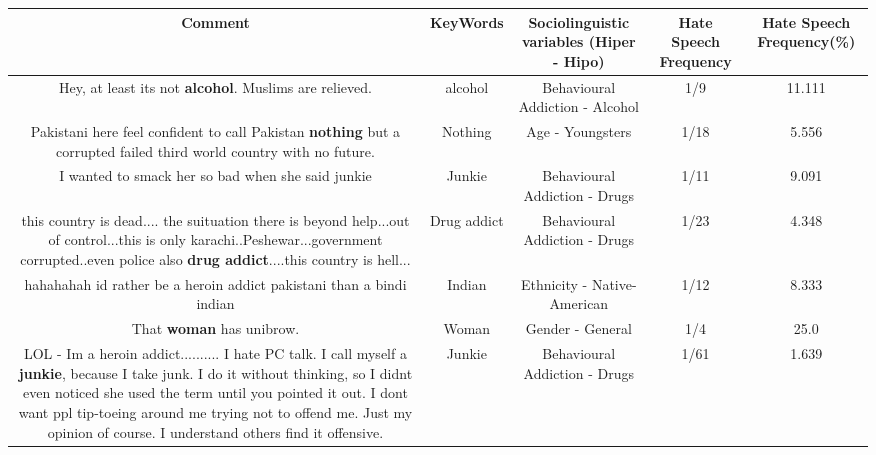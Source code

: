 \documentclass[11pt]{article}
\newlength\mylength
\begin{document}
\begin{center}
\setlength\mylength{\dimexpr\textwidth - 1\arrayrulewidth - 50\tabcolsep}
\begin{longtable}{|C{.65\mylength}|C{.30\mylength}|C{.12\mylength}|C{.12\mylength}|C{.12\mylength}|}
\hline
\textbf{Comment} & \textbf{KeyWords} & \textbf{Sociolinguistic variables (Hiper - Hipo)}  & \textbf{Hate Speech Frequency} & \textbf{Hate Speech Frequency(\%)} \\
\hline{}\small Hey, at least its not \textbf{alcohol}.  Muslims are relieved.\normalsize   & alcohol & Behavioural Addiction - Alcohol & 1/9 & 11.111 \\  \hline
  \small Pakistani here feel confident to call Pakistan \textbf{nothing} but a corrupted failed third world country with no future.\normalsize   & Nothing & Age - Youngsters & 1/18 & 5.556 \\  \hline
  \small I wanted to smack her so bad when she said junkie\normalsize   & Junkie & Behavioural Addiction - Drugs & 1/11 & 9.091 \\  \hline
  \small this country is dead.... the suituation there is beyond help...out of control...this is only karachi..Peshewar...government corrupted..even police also \textbf{drug addict}....this country is hell...\normalsize   & Drug addict & Behavioural Addiction - Drugs & 1/23 & 4.348 \\  \hline
  \small hahahahah id rather be a heroin addict pakistani than a bindi indian\normalsize   & Indian & Ethnicity - Native-American & 1/12 & 8.333 \\  \hline
  \small That \textbf{woman} has unibrow.\normalsize   & Woman & Gender - General & 1/4 & 25.0 \\  \hline
  \small LOL - Im a heroin addict.......... I hate PC talk.  I call myself a \textbf{junkie}, because I take junk.  I do it without thinking, so I didnt even noticed she used the term until you pointed it out.   I dont want ppl tip-toeing around me trying not to offend me.   Just my opinion of course.  I understand others find it offensive.\normalsize   & Junkie & Behavioural Addiction - Drugs & 1/61 & 1.639 \\  \hline

\end{longtable}
\end{center}
\end{document}

